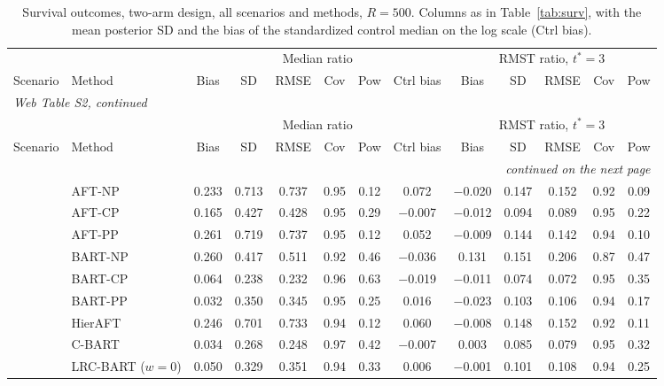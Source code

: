 \begin{center}
\scriptsize
\setlength{\tabcolsep}{3pt}
\renewcommand{\arraystretch}{0.8}
\begin{longtable}{llccccccccccc}
\caption{Survival outcomes, two-arm design, all scenarios and methods, $R=500$. Columns as in Table~\ref{tab:surv}, with the mean posterior SD and the bias of the standardized control median on the log scale (Ctrl bias).}\label{tab:surv_full}\\
\toprule
& & \multicolumn{6}{c}{Median ratio} & \multicolumn{5}{c}{RMST ratio, $t^\ast=3$} \\
\cmidrule(lr){3-8}\cmidrule(lr){9-13}
Scenario & Method & Bias & SD & RMSE & Cov & Pow & Ctrl bias & Bias & SD & RMSE & Cov & Pow \\
\midrule
\endfirsthead
\multicolumn{13}{l}{\textit{Web Table S2, continued}}\\
\toprule
& & \multicolumn{6}{c}{Median ratio} & \multicolumn{5}{c}{RMST ratio, $t^\ast=3$} \\
\cmidrule(lr){3-8}\cmidrule(lr){9-13}
Scenario & Method & Bias & SD & RMSE & Cov & Pow & Ctrl bias & Bias & SD & RMSE & Cov & Pow \\
\midrule
\endhead
\midrule
\multicolumn{13}{r}{\textit{continued on the next page}}\\
\endfoot
\bottomrule
\endlastfoot
\multirow{15}{*}{Sc1} & AFT-NP & 0.233 & 0.713 & 0.737 & 0.95 & 0.12 & 0.072 & $-$0.020 & 0.147 & 0.152 & 0.92 & 0.09 \\
& AFT-CP & 0.165 & 0.427 & 0.428 & 0.95 & 0.29 & $-$0.007 & $-$0.012 & 0.094 & 0.089 & 0.95 & 0.22 \\
& AFT-PP & 0.261 & 0.719 & 0.737 & 0.95 & 0.12 & 0.052 & $-$0.009 & 0.144 & 0.142 & 0.94 & 0.10 \\
& BART-NP & 0.260 & 0.417 & 0.511 & 0.92 & 0.46 & $-$0.036 & 0.131 & 0.151 & 0.206 & 0.87 & 0.47 \\
& BART-CP & 0.064 & 0.238 & 0.232 & 0.96 & 0.63 & $-$0.019 & $-$0.011 & 0.074 & 0.072 & 0.95 & 0.35 \\
& BART-PP & 0.032 & 0.350 & 0.345 & 0.95 & 0.25 & 0.016 & $-$0.023 & 0.103 & 0.106 & 0.94 & 0.17 \\
& HierAFT & 0.246 & 0.701 & 0.733 & 0.94 & 0.12 & 0.060 & $-$0.008 & 0.148 & 0.152 & 0.92 & 0.11 \\
& C-BART & 0.034 & 0.268 & 0.248 & 0.97 & 0.42 & $-$0.007 & 0.003 & 0.085 & 0.079 & 0.95 & 0.32 \\
& LRC-BART ($w=0$) & 0.050 & 0.329 & 0.351 & 0.94 & 0.33 & 0.006 & $-$0.001 & 0.101 & 0.108 & 0.94 & 0.25 \\

\end{longtable}
\end{center}
